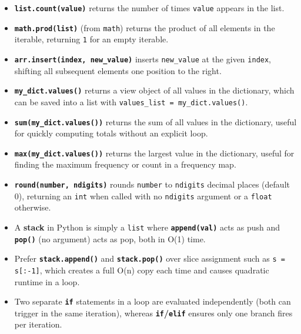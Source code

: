 \documentclass{article}
\begin{document}
\begin{itemize}
    \item \textbf{\texttt{list.count(value)}} returns the number of times \texttt{value} appears in the list.

    \item \textbf{\texttt{math.prod(list)}} (from \texttt{math}) returns the product of all elements in the iterable, returning \texttt{1} for an empty iterable.

    \item \textbf{\texttt{arr.insert(index, new\_value)}} inserts \texttt{new\_value} at the given \texttt{index}, shifting all subsequent elements one position to the right.

    \item \textbf{\texttt{my\_dict.values()}} returns a view object of all values in the dictionary, which can be saved into a list with \texttt{values\_list = my\_dict.values()}.

    \item \textbf{\texttt{sum(my\_dict.values())}} returns the sum of all values in the dictionary, useful for quickly computing totals without an explicit loop.

    \item \textbf{\texttt{max(my\_dict.values())}} returns the largest value in the dictionary, useful for finding the maximum frequency or count in a frequency map.

    \item \textbf{\texttt{round(number, ndigits)}} rounds \texttt{number} to \texttt{ndigits} decimal places (default 0), returning an \texttt{int} when called with no \texttt{ndigits} argument or a \texttt{float} otherwise.

    \item A \textbf{stack} in Python is simply a \texttt{list} where \textbf{\texttt{append(val)}} acts as push and \textbf{\texttt{pop()}} (no argument) acts as pop, both in O(1) time.

    \item Prefer \textbf{\texttt{stack.append()}} and \textbf{\texttt{stack.pop()}} over slice assignment such as \texttt{s = s[:-1]}, which creates a full O(n) copy each time and causes quadratic runtime in a loop.

    \item Two separate \textbf{\texttt{if}} statements in a loop are evaluated independently (both can trigger in the same iteration), whereas \textbf{\texttt{if}/\texttt{elif}} ensures only one branch fires per iteration.


\end{itemize}
\end{document}
